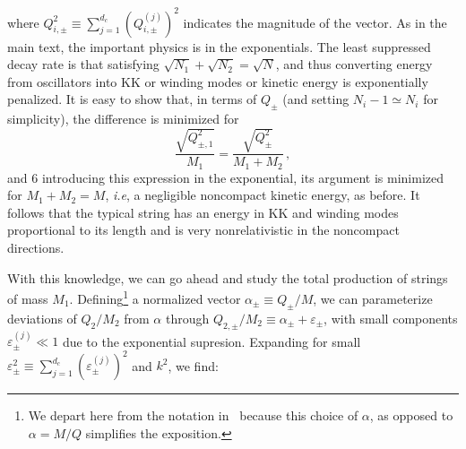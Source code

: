 \documentclass[a4paper,11pt]{article}
\newcommand{\lr}[1]{\left(#1\right)}
\begin{document}
where $Q_{i,\pm}^2\equiv \sum_{j=1}^{d_c} \lr{Q_{i,\pm}^{(j)}}^2$ indicates the magnitude of the vector.
As in the main text, the important physics is in the exponentials.
The least suppressed decay rate is that satisfying $\sqrt{N_1}+\sqrt{N_2}=\sqrt{N}$, and thus converting energy from oscillators into KK or winding modes or kinetic energy is exponentially penalized.
It is easy to show that, in terms of $Q_{\pm}$ (and setting $N_i-1\simeq N_i$ for simplicity), the difference is minimized for 
\begin{equation}
    \frac{\sqrt{Q_{\pm,1}^2}}{M_1}=\frac{\sqrt{Q_{\pm}^2}}{M_1+M_2}\, ,
\end{equation}
and 6 introducing this expression in the exponential, its argument is minimized for $M_1+M_2=M$, \textit{i.e}, a negligible noncompact kinetic energy, as before.
It follows that the typical string has an energy in KK and winding modes proportional to its length and is very nonrelativistic in the noncompact directions.

With this knowledge, we can go ahead and study the total production of strings of mass $M_1$.
Defining\footnote{We depart here from the notation in~\cite{Chen:2005ra} because this choice of $\alpha$, as opposed to $\alpha =M/Q$ simplifies the exposition.} a normalized vector $\alpha_{\pm}\equiv Q_{\pm}/M$, we can parameterize deviations of $Q_2/M_2$ from $\alpha$ through $Q_{2,\pm}/M_2\equiv \alpha_{\pm}+\varepsilon_{\pm}$, with small components $\varepsilon_{\pm}^{(j)}\ll 1$ due to the exponential supresion. 
Expanding for small $\varepsilon_{\pm}^2\equiv \sum_{j=1}^{d_c}{\lr{\varepsilon_\pm^{(j)}}^2}$ and $k^2$, we find:
\end{document}
